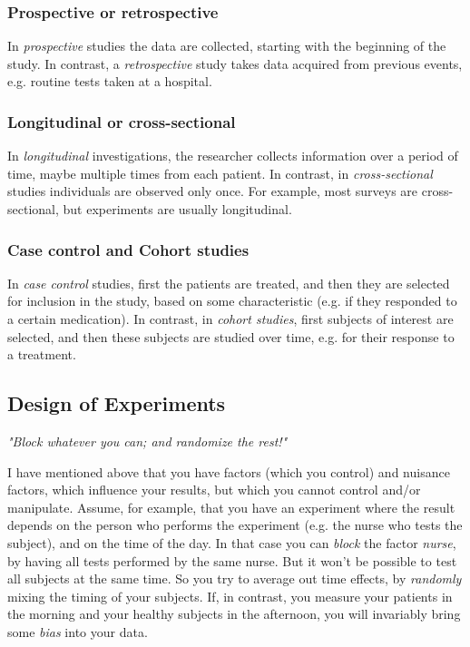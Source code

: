 \subsubsection{Prospective or retrospective}
In \emph{prospective} studies the data are collected, starting with the beginning of the study. In contrast, a \emph{retrospective} study takes data acquired from previous events, e.g. routine tests taken at a hospital.

\subsubsection{Longitudinal or cross-sectional}
In \emph{longitudinal} investigations, the researcher collects information over a period of time, maybe multiple times from each patient. In contrast, in \emph{cross-sectional} studies individuals are observed only once. For example, most surveys are cross-sectional, but experiments are usually longitudinal.

\subsubsection{Case control and Cohort studies}
In \emph{case control} studies, first the patients are treated, and then they are selected for inclusion in the study, based on some characteristic (e.g. if they responded to a certain medication). In contrast, in \emph{cohort studies}, first subjects of interest are selected, and then these subjects are studied over time, e.g. for their response to a treatment.

\subsection{Design of Experiments}

\emph{"Block whatever you can; and randomize the rest!"}

I have mentioned above that you have factors (which you control) and nuisance factors, which influence your results, but which you cannot control and/or manipulate. Assume, for example, that you have an experiment where the result depends on the person who performs the experiment (e.g. the nurse who tests the subject), and on the time of the day. In that case you can \emph{block} the factor \emph{nurse}, by having all tests performed by the same nurse. But it won't be possible to test all subjects at the same time. So you try to average out time effects, by \emph{randomly} mixing the timing of your subjects. If, in contrast, you measure your patients in the morning and your healthy subjects in the afternoon, you will invariably bring some \emph{bias} into your data.

